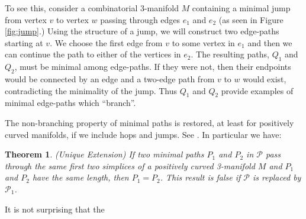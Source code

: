 \documentclass[12pt]{article}
\newtheorem{thm}{Theorem}[section]
\begin{document}
To see this, consider a combinatorial 3-manifold $M$ containing a minimal jump from vertex $v$ to vertex $w$ passing through edges $e_1$ and $e_2$ (as seen in Figure \ref{fig:jump}.) Using the structure of a jump, we will construct two edge-paths starting at $v$. We choose the first edge from $v$ to some vertex in $e_1$ and then we can continue the path to either of the vertices in $e_2$. The resulting paths, $Q_1$ and $Q_2$, must be minimal among edge-paths. If they were not, then their endpoints would be connected by an edge and a two-edge path from $v$ to $w$ would exist, contradicting the minimality of the jump. Thus $Q_1$ and $Q_2$ provide examples of minimal edge-paths which ``branch''.

The non-branching property of minimal paths is restored, at least for positively curved manifolds, if we include hops and jumps. See \cite{Trout10}. In particular we have:

\begin{thm}(Unique Extension) If two minimal paths $P_1$ and $P_2$ in $\mathcal{P}$ pass through the same first two simplices of a positively curved 3-manifold $M$ and $P_1$ and $P_2$ have the same length, then $P_1 = P_2$. This result is false if $\mathcal{P}$ is replaced by $\mathcal{P}_1$.
\end{thm}

\noindent It is not surprising that the 



\end{document}
